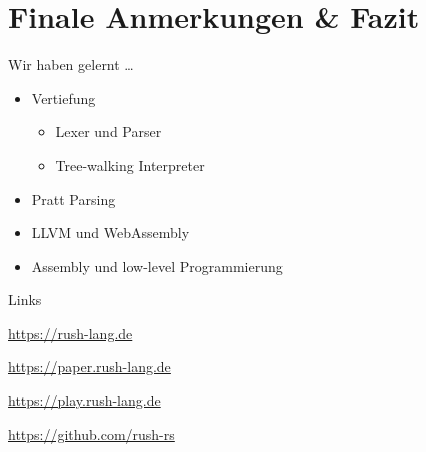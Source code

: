 \section{Finale Anmerkungen \& Fazit}
\begin{frame}{Wir haben gelernt \dots}
	\begin{itemize}
		\item<1-> Vertiefung
			\begin{itemize}
				\item <2-> Lexer und Parser
				\item <3-> Tree-walking Interpreter
			\end{itemize}
		\item<4-> Pratt Parsing
		\item<5-> LLVM und WebAssembly
		\item<6-> Assembly und low-level Programmierung
	\end{itemize}
\end{frame}

\begin{frame}{Links}
	\centering
	\begin{minipage}{.5\textwidth}
		\begin{description}
			\item<1->[rush Website] \url{https://rush-lang.de}
			\item<2->[Paper] \url{https://paper.rush-lang.de}
			\item<3->[Playground] \url{https://play.rush-lang.de}
			\item<4->[GitHub] \url{https://github.com/rush-rs}
		\end{description}
	\end{minipage}
\end{frame}
